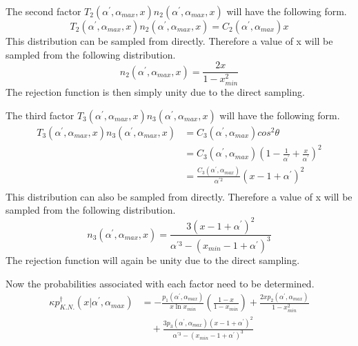 The second factor $T_2(\alpha^{'},\alpha_{max},x)n_2(\alpha^{'},\alpha_{max},x)$
will have the following form.
\begin{equation*}
  T_2(\alpha^{'},\alpha_{max},x)n_2(\alpha^{'},\alpha_{max},x) = 
  C_2(\alpha^{'},\alpha_{max})x
\end{equation*}
This distribution can be sampled from directly. Therefore a value of x will
be sampled from the following distribution.
\begin{equation}
  n_2(\alpha^{'},\alpha_{max},x) = \frac{2x}{1-x_{min}^2}
\end{equation}
The rejection function is then simply unity due to the direct sampling.

The third factor $T_3(\alpha^{'},\alpha_{max},x)n_3(\alpha^{'},\alpha_{max},x)$
will have the following form.
\begin{align}
  T_3(\alpha^{'},\alpha_{max},x)n_3(\alpha^{'},\alpha_{max},x) & = 
  C_3(\alpha^{'},\alpha_{max})cos^2\theta \nonumber \\
  & = C_3(\alpha^{'},\alpha_{max})
  \left(1 - \frac{1}{\alpha^{'}} + \frac{x}{\alpha^{'}}\right)^2 \nonumber \\
  & = \frac{C_3(\alpha^{'},\alpha_{max})}{\alpha^{'2}}\left(x-1+\alpha^{'}\right)^2
  \nonumber \\
\end{align}
This distribution can also be sampled from directly. Therefore a value of x
will be sampled from the following distribution.
\begin{equation}
  n_3(\alpha^{'},\alpha_{max},x) = \frac{3\left(x-1+\alpha^{'}\right)^2}
  {\alpha^{'3} - \left(x_{min}-1+\alpha^{'}\right)^3}
\end{equation}
The rejection function will again be unity due to the direct sampling.

Now the probabilities associated with each factor need to be determined.
\begin{align}
  \kappa p_{K.N.}^{\dagger}(x|\alpha^{'},\alpha_{max}) & = 
  -\frac{p_1(\alpha^{'},\alpha_{max})}{x\ln{x_{min}}}
  \left(\frac{1-x}{1-x_{min}}\right) +
  \frac{2xp_2(\alpha^{'},\alpha_{max})}{1-x_{min}^2} \nonumber \\
  & \quad +
  \frac{3p_3(\alpha^{'},\alpha_{max})\left(x-1+\alpha^{'}\right)^2}
  {\alpha^{'3} - \left(x_{min}-1+\alpha^{'}\right)^3} \nonumber
\end{align}

